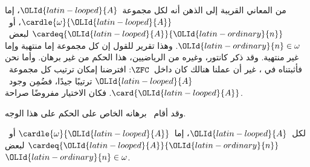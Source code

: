 \documentclass[../../../include/open-logic-section]{subfiles}
\begin{document}
\begin{ex}
من المعاني القريبة إلى الذهن أنه لكل مجموعة~${\OLId{latin-looped}{A}}$، إما
$\cardle{\omega}{{\OLId{latin-looped}{A}}}$، أو~$\cardeq{{\OLId{latin-looped}{A}}}{{\OLId{latin-ordinary}{n}}}$ لبعض~${\OLId{latin-ordinary}{n}} \in \omega$. وهذا
تقرير للقول إن كل مجموعة إما منتهية وإما غير منتهية. وقد ذكر كانتور،
وغيره من الرياضيين، هذا الحكم من غير برهان. وأما نحن فأثبتناه في
، غير أن عملنا
هنالك كان داخل~$\ZFC$: افترضنا إمكان ترتيب كل مجموعة~${\OLId{latin-looped}{A}}$ ترتيبًا
جيدًا، فضُمِن وجود~$\card{{\OLId{latin-looped}{A}}}$. فكان الاختيار مفروضًا صراحة.

وقد أقام~\citet{Dedekind1888} برهانه الخاص على الحكم على هذا الوجه.

\begin{thm}
لكل~${\OLId{latin-looped}{A}}$، إما~$\cardle{\omega}{{\OLId{latin-looped}{A}}}$ أو~$\cardeq{{\OLId{latin-looped}{A}}}{{\OLId{latin-ordinary}{n}}}$ لبعض
${\OLId{latin-ordinary}{n}} \in \omega$.
\end{thm}


\end{ex}
\end{document}
